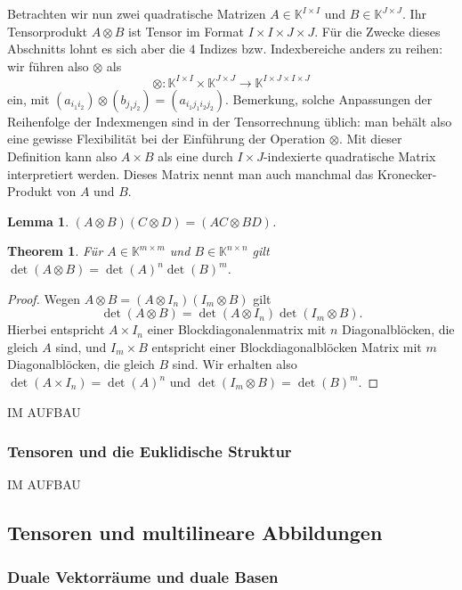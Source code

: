 \documentclass[
a4paper,landscape,16pt,
bibliography=totocnumbered,
numbers=noenddot,
]{scrartcl}
\numberwithin{equation}{subsection}
\newcommand{\K}{\mathbb K}
\theoremstyle{plain}
\newtheorem*{thm}{Theorem}
\newtheorem*{lm}{Lemma}
\theoremstyle{definition}
\begin{document}
Betrachten wir nun zwei quadratische Matrizen $A \in \K^{I \times I}$ und $B \in \K^{J \times J}$. Ihr Tensorprodukt $A \otimes B$ ist Tensor im Format $I \times I \times J \times J$. Für die Zwecke dieses Abschnitts lohnt es sich aber die $4$ Indizes bzw. Indexbereiche anders zu reihen: wir führen also $\otimes$ als 
\[
	\otimes : \K^{I \times I} \times \K^{J \times J} \to \K^{I \times J \times I \times J} 
\]
ein, mit $(a_{i_1 i_2} ) \otimes (b_{j_1 j_2}) = (a_{i_1 j_1 i_2 j_2})$. Bemerkung, solche Anpassungen der Reihenfolge der Indexmengen sind in der Tensorrechnung üblich: man behält also eine gewisse Flexibilität bei der Einführung der Operation $\otimes$. Mit dieser Definition kann also $A \times B$ als eine durch $I \times J$-indexierte quadratische Matrix interpretiert werden. Dieses Matrix nennt man auch manchmal das Kronecker-Produkt von $A$ und $B$. 

\begin{lm}
	$(A \otimes B) (C \otimes D) = (AC \otimes BD)$. 
\end{lm} 

\begin{thm}
		Für $A \in \K^{m \times m}$ und $B \in \K^{n\times n}$ gilt $\det(A \otimes B) = \det(A)^n \det(B)^m$. 
\end{thm} 
\begin{proof} 
	Wegen $A \otimes B = (A \otimes I_n) (I_m  \otimes B)$ gilt 
	\[
		\det(A \otimes B) = \det(A \otimes I_n) \det (I_m \otimes B). 
	\]
Hierbei entspricht $A \times I_n$ einer Blockdiagonalenmatrix mit $n$ Diagonalblöcken, die gleich $A$ sind, und $I_m \times B$ entspricht einer Blockdiagonalblöcken Matrix mit $m$ Diagonalblöcken, die gleich $B$ sind. Wir erhalten also $\det( A \times I_n) = \det(A)^n$ und $\det(I_m \otimes B) = \det(B)^m$. 
\end{proof} 

IM AUFBAU 

\subsubsection{Tensoren und die Euklidische Struktur} 

IM AUFBAU 

\subsection{Tensoren und multilineare Abbildungen} 

\subsubsection{Duale Vektorräume und duale Basen}
\end{document}
